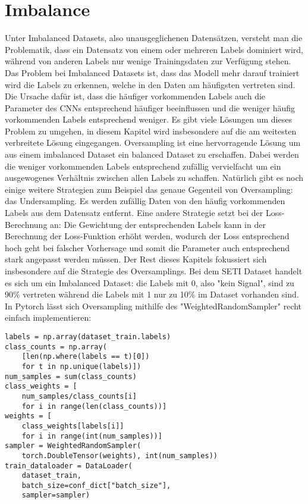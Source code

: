 \documentclass[11pt, a4paper]{article}
\begin{document}
\tableofcontents
\thispagestyle{empty}
\newpage

\section{Imbalance}
Unter Imbalanced Datasets, also unausgeglichenen Datensätzen, versteht man die Problematik, dass ein Datensatz von einem oder mehreren Labels dominiert wird, während von anderen Labels nur wenige Trainingsdaten zur Verfügung stehen. Das Problem bei Imbalanced Datasets ist, dass das Modell mehr darauf trainiert wird die Labels zu erkennen, welche in den Daten am häufigsten vertreten sind. Die Ursache dafür ist, dass die häufiger vorkommenden Labels auch die Parameter des CNNs entsprechend häufiger beeinflussen und die weniger häufig vorkommenden Labels entsprechend weniger. Es gibt viele Lösungen um dieses Problem zu umgehen, in diesem Kapitel wird insbesondere auf die am weitesten verbreitete Lösung eingegangen.
\newline
Oversampling ist eine hervorragende Lösung um aus einem imbalanced Dataset ein balanced Dataset zu erschaffen. Dabei werden die weniger vorkommenden Labels entsprechend zufällig vervielfacht um ein ausgewogenes Verhältnis zwischen allen Labels zu schaffen. Natürlich gibt es noch einige weitere Strategien zum Beispiel das genaue Gegenteil von Oversampling: das Undersampling. Es werden zufällig Daten von den häufig vorkommenden Labels aus dem Datensatz entfernt. Eine andere Strategie setzt bei der Loss-Berechnung an: Die Gewichtung der entsprechenden Labels kann in der Berechnung der Loss-Funktion erhöht werden, wodurch der Loss entsprechend hoch geht bei falscher Vorhersage und somit die Parameter auch entsprechend stark angepasst werden müssen. Der Rest dieses Kapitels fokussiert sich insbesondere auf die Strategie des Oversamplings.
\newline
Bei dem SETI Dataset handelt es sich um ein Imbalanced Dataset: die Labels mit 0, also "kein Signal", sind zu 90\% vertreten während die Labels mit 1 nur zu 10\% im Dataset vorhanden sind. In Pytorch lässt sich Oversampling mithilfe des "WeightedRandomSampler" recht einfach implementieren:
\begin{lstlisting}
labels = np.array(dataset_train.labels)
class_counts = np.array(
	[len(np.where(labels == t)[0]) 
	for t in np.unique(labels)])
num_samples = sum(class_counts)
class_weights = [
	num_samples/class_counts[i] 
	for i in range(len(class_counts))]
weights = [
	class_weights[labels[i]] 
	for i in range(int(num_samples))]
sampler = WeightedRandomSampler(
	torch.DoubleTensor(weights), int(num_samples))
train_dataloader = DataLoader(
	dataset_train, 
	batch_size=conf_dict["batch_size"], 
	sampler=sampler)
\end{lstlisting}
\end{document}
